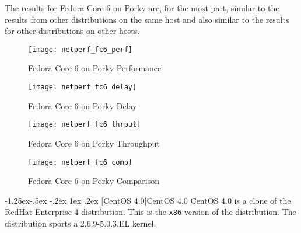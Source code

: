 \documentclass[letterpaper,final,notitlepage,twocolumn,10pt,twoside]{article}
\makeatletter
\renewcommand\subsubsection{\@startsection{subsubsection}{3}{\z@}%
                                     {-1.25ex\@plus -.5ex \@minus -.2ex}%
                                     {1ex \@plus .2ex}%
                                     {\normalfont\normalsize\bfseries}}
\makeatother
\begin{document}
The results for Fedora Core 6 on Porky are, for the most part, similar to the results from other
distributions on the same host and also similar to the results for other distributions on other
hosts.

\begin{figure}[p]
\center\texttt{[image: netperf\_fc6\_perf]}
\caption[Fedora Core 6 on Porky Performance]{Fedora Core 6 on Porky Performance}
\label{figure:fc6perf}
\end{figure}

\begin{figure}[p]
\center\texttt{[image: netperf\_fc6\_delay]}
\caption[Fedora Core 6 on Porky Delay]{Fedora Core 6 on Porky Delay}
\label{figure:fc6dly}
\end{figure}

\begin{figure}[p]
\center\texttt{[image: netperf\_fc6\_thrput]}
\caption[Fedora Core 6 on Porky Throughput]{Fedora Core 6 on Porky Throughput}
\label{figure:fc6thrput}
\end{figure}

\begin{figure}[pt]
\center\texttt{[image: netperf\_fc6\_comp]}
\caption[Fedora Core 6 on Porky Comparison]{Fedora Core 6 on Porky Comparison}
\label{figure:fc6comp}
\end{figure}

\subsubsection[CentOS 4.0]{CentOS 4.0}
CentOS 4.0 is a clone of the RedHat Enterprise 4 distribution.  This is the
\texttt{x86} version of the distribution.  The distribution sports a
2.6.9-5.0.3.EL kernel.
\end{document}
